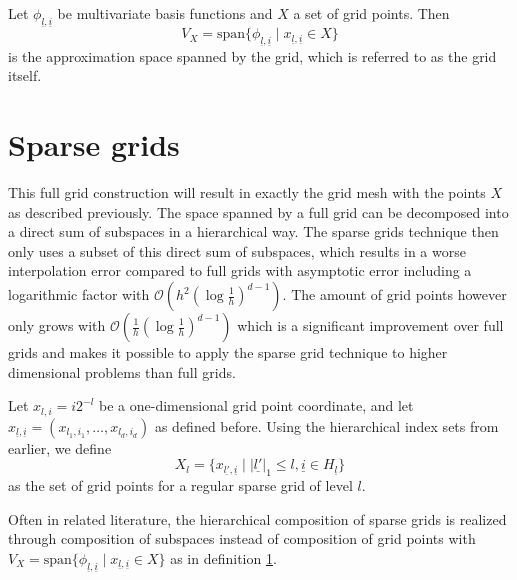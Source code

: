\documentclass[
  a4paper,  %
  twoside,  %
  bibliography=totoc,
  headsepline,
  cleardoublepage=empty,
  parskip=half,
  draft=false
]{scrbook}
\begin{document}
\begin{definition}[Grid]
Let $\phi_{\underline{l},\underline{i}}$ be multivariate basis functions and $X$ a set of grid points.
Then
\begin{equation}
V_X=\text{span} \{\phi_{\underline{l},\underline{i}} \mid x_{\underline{l},\underline{i}} \in X\}
\end{equation}
is the approximation space spanned by the grid, which is referred to as the grid itself.
\end{definition}


\section{Sparse grids}

This full grid construction will result in exactly the grid mesh with the points $X$ as described previously.
The space spanned by a full grid can be decomposed into a direct sum of subspaces in a hierarchical way.
The sparse grids technique then only uses a subset of this direct sum of subspaces, which results in a worse interpolation error compared to full grids with asymptotic error including a logarithmic factor with $\mathcal{O}(h^2 (\log \frac{1}{h})^{d-1})$.
The amount of grid points however only grows with $\mathcal{O}(\frac{1}{h} (\log \frac{1}{h})^{d-1})$ which is a significant improvement over full grids and makes it possible to apply the sparse grid technique to higher dimensional problems than full grids.

\begin{definition}
Let $x_{l,i}=i2^{-l}$ be a one-dimensional grid point coordinate, and let $x_{\underline{l},\underline{i}}=(x_{l_1,i_1}, \dots, x_{l_d,i_d})$ as defined before.
Using the hierarchical index sets from earlier, we define
\begin{equation}
X_{l}=\{x_{\underline{l'},\underline{i}} \mid |\underline{l'}|_1 \leq l, \underline{i} \in H_{\underline{l}}\}
\end{equation}
as the set of grid points for a regular sparse grid of level $l$.
\end{definition}

Often in related literature, the hierarchical composition of sparse grids is realized through composition of subspaces instead of composition of grid points with $V_X=\text{span} \{\phi_{\underline{l},\underline{i}} \mid x_{\underline{l},\underline{i}} \in X\}$ as in definition \ref{}.
\end{document}
